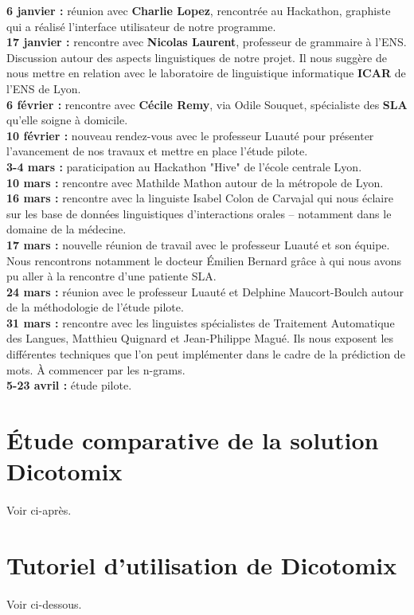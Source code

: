 \documentclass[11pt,a4paper]{article}
\theoremstyle{plain}
\theoremstyle{definition}
\begin{document}
\textbf{6 janvier : } réunion avec \textbf{Charlie Lopez}, rencontrée au Hackathon, graphiste qui a réalisé l'interface utilisateur de notre programme. \\

\textbf{17 janvier : } rencontre avec \textbf{Nicolas Laurent}, professeur de grammaire à l'ENS. Discussion autour des aspects linguistiques de notre projet. Il nous suggère de nous mettre en relation avec le laboratoire de linguistique informatique \textbf{ICAR} de l'ENS de Lyon. \\

\textbf{6 février : } rencontre avec \textbf{Cécile Remy}, via Odile Souquet, spécialiste des \textbf{SLA} qu'elle soigne à domicile. \\

\textbf{10 février : } nouveau rendez-vous avec le professeur Luauté pour présenter l'avancement de nos travaux et mettre en place l'étude pilote. \\

\textbf{3-4 mars : } paraticipation au Hackathon "Hive" de l'école centrale Lyon. \\

\textbf{10 mars : } rencontre avec Mathilde Mathon autour de la métropole de Lyon. \\

\textbf{16 mars : } rencontre avec la linguiste Isabel Colon de Carvajal qui nous éclaire sur les base de données linguistiques d'interactions orales -- notamment dans le domaine de la médecine. \\

\textbf{17 mars : } nouvelle réunion de travail avec le professeur Luauté et son équipe. Nous rencontrons notamment le docteur Émilien Bernard grâce à qui nous avons pu aller à la rencontre d'une patiente SLA. \\

\textbf{24 mars : } réunion avec le professeur Luauté et Delphine Maucort-Boulch autour de la méthodologie de l'étude pilote. \\

\textbf{31 mars : } rencontre avec les linguistes spécialistes de Traitement Automatique des Langues, Matthieu Quignard et Jean-Philippe Magué. Ils nous exposent les différentes techniques que l'on peut implémenter dans le cadre de la prédiction de mots. À commencer par les n-grams.\\

\textbf{5-23 avril : } étude pilote. \\
    

\section{Étude comparative de la solution Dicotomix}
\paragraph{} Voir ci-après.
\section{Tutoriel d'utilisation de Dicotomix}
\paragraph{} Voir ci-dessous.



\end{document}
